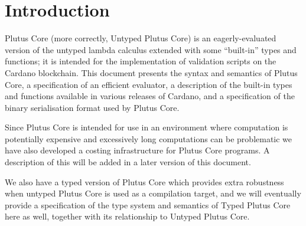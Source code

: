 \section{Introduction}
\label{sec:introduction}
Plutus Core (more correctly, Untyped Plutus Core) is an eagerly-evaluated
version of the untyped lambda calculus extended with some ``built-in'' types and
functions; it is intended for the implementation of validation scripts on the
Cardano blockchain.  This document presents the syntax and semantics of Plutus
Core, a specification of an efficient evaluator, a description of the built-in
types and functions available in various releases of Cardano, and
a specification of the binary serialisation format used by Plutus Core.

Since Plutus Core is intended for use in an environment where
computation is potentially expensive and excessively long computations can be
problematic we have also developed a costing infrastructure for Plutus Core
programs. A description of this will be added in a later version of this
document.

We also have a typed version of Plutus Core which provides extra robustness when
untyped Plutus Core is used as a compilation target, and we will eventually
provide a specification of the type system and semantics of Typed Plutus Core
here as well, together with its relationship to Untyped Plutus Core.

